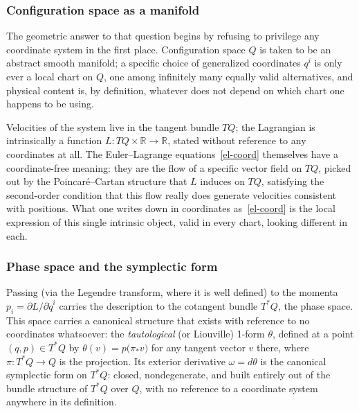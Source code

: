 \subsubsection{Configuration space as a manifold}

The geometric answer to that question begins by refusing to
privilege any coordinate system in the first place. Configuration
space $Q$ is taken to be an abstract smooth manifold; a specific
choice of generalized coordinates $q^i$ is only ever a local chart on
$Q$, one among infinitely many equally valid alternatives, and
physical content is, by definition, whatever does not depend on
which chart one happens to be using.

Velocities of the system live in the tangent bundle $TQ$; the Lagrangian is
intrinsically a function $L : TQ\times\mathbb R \to \mathbb R$, stated without
reference to any coordinates at all. The Euler--Lagrange
equations~\eqref{el-coord} themselves have a coordinate-free meaning: they are
the flow of a specific vector field on $TQ$, picked out by the
Poincar\'e--Cartan structure that $L$ induces on $TQ$, satisfying the
second-order condition that this flow really does generate velocities
consistent with positions. What one writes down in coordinates
as~\eqref{el-coord} is the local expression of this single intrinsic object,
valid in every chart, looking different in each.

\subsubsection{Phase space and the symplectic form}

Passing (via the Legendre transform, where it is well defined) to
the momenta $p_i = \partial L/\partial \dot q^i$ carries the
description to the cotangent bundle $T^*Q$, the phase space. This
space carries a canonical structure that exists with reference to no
coordinates whatsoever: the \emph{tautological} (or Liouville) 1-form
$\theta$, defined at a point $(q,p)\in T^*Q$ by $\theta(v) =
p\bigl(\pi_*v\bigr)$ for any tangent vector $v$ there, where $\pi:
T^*Q\to Q$ is the projection. Its exterior derivative $\omega =
d\theta$ is the canonical symplectic form on $T^*Q$: closed,
nondegenerate, and built entirely out of the bundle structure of
$T^*Q$ over $Q$, with no reference to a coordinate system anywhere in
its definition.

